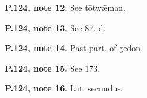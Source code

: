 \textbf{P.124, note 12.} See tōtwǣman.

\textbf{P.124, note 13.} See 87. d.

\textbf{P.124, note 14.} Past part. of gedōn.

\textbf{P.124, note 15.} See 173.

\textbf{P.124, note 16.} Lat. secundus.

\endgroup

\par\label{end-ch05-learner}
\clearpage\endgroup
